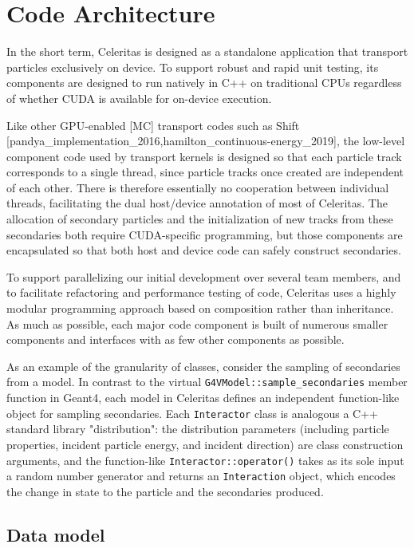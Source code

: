 \hypertarget{code-architecture}{%
\section{Code Architecture}\label{code-architecture}}

In the short term, Celeritas is designed as a standalone application
that transport particles exclusively on device. To support robust and
rapid unit testing, its components are designed to run natively in C++
on traditional CPUs regardless of whether CUDA is available for
on-device execution.

Like other GPU-enabled {[}MC{]} transport codes such as Shift
{[}pandya\_implementation\_2016,hamilton\_continuous-energy\_2019{]},
the low-level component code used by transport kernels is designed so
that each particle track corresponds to a single thread, since particle
tracks once created are independent of each other. There is therefore
essentially no cooperation between individual threads, facilitating the
dual host/device annotation of most of Celeritas. The allocation of
secondary particles and the initialization of new tracks from these
secondaries both require CUDA-specific programming, but those components
are encapsulated so that both host and device code can safely construct
secondaries.

To support parallelizing our initial development over several team
members, and to facilitate refactoring and performance testing of code,
Celeritas uses a highly modular programming approach based on
composition rather than inheritance. As much as possible, each major
code component is built of numerous smaller components and interfaces
with as few other components as possible.

As an example of the granularity of classes, consider the sampling of
secondaries from a model. In contrast to the virtual
\texttt{G4VModel::sample\_secondaries} member function in Geant4, each
model in Celeritas defines an independent function-like object for
sampling secondaries. Each \texttt{Interactor} class is analogous a C++
standard library "distribution": the distribution parameters (including
particle properties, incident particle energy, and incident direction)
are class construction arguments, and the function-like
\texttt{Interactor::operator()} takes as its sole input a random number
generator and returns an \texttt{Interaction} object, which encodes the
change in state to the particle and the secondaries produced.

\hypertarget{data-model}{%
\subsection{Data model}\label{data-model}}

